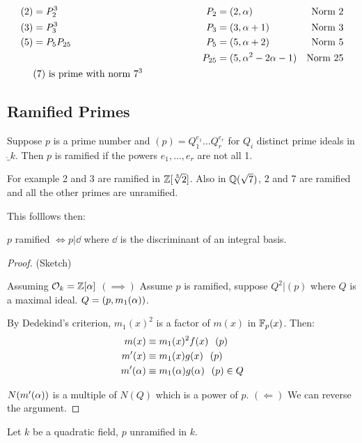 \documentclass[11pt]{article}
\begin{document}
 \begin{align*}
	 (2) &= P_2^3   \hspace{125pt}&    P_2 &= (2, \A) & \text{Norm 2}\\
	 (3) &= P_3^3            \hspace{125pt}& P_3 &=(3, \A+1) & \text{Norm 3} \\
	 (5) &= P_5 P_{25} 	\hspace{125pt} & P_5 &= (5,\A+2) & \text{Norm 5}\\
	 & \hspace{125pt} & P_{25} &= (5, \A^2 - 2\A-1) & \text{Norm 25}\\
	 &(7) \text{ is prime with norm } 7^3
 \end{align*}
 
 \subsection{Ramified Primes}

 Suppose $p$ is a prime number and $(p) = Q_1^{e_1} \dots Q_r^{e_r}$ for $Q_i$ distinct prime ideals in $\ring_k$.
 Then $p$ is ramified if the powers $e_1, \dots, e_r$ are not all 1.

 For example 2 and 3 are ramified in $\mathbb{Z}[\sqrt[3]{2}]$.
 \spac
 Also in $\mathbb{Q}(\sqrt7)$, 2 and 7 are ramified and all the other primes are unramified.

 This folllows then:
 
 \begin{theorem}
$p$ ramified $\iff p | \dd$ where $\dd$ is the discriminant of an integral basis.
 \end{theorem}
 
 
 \begin{proof}
	 (Sketch)

	 Assuming $\mathcal{O}_k = \mathbb{Z}[\alpha]$
	 \spac
	 $(\implies) $ Assume $p$ is ramified, suppose $Q^2 | (p)$ where $Q$ is a maximal ideal. 
	 $Q = (p, m_1(\alpha))$.

	 By Dedekind's criterion, $m_1(x)^2$ is a factor of $m(x)$ in $\mathbb{F}_p(x)$.
	 Then:
	 \begin{align*}
		 m(x) &\equiv m_1(x)^2 f(x) \hspace{7pt} (p)\\
		 m'(x) &\equiv m_1(x) g(x) \hspace{7pt} (p)\\
		 m'(\alpha) &\equiv m_1(\alpha) g(\alpha) \hspace{7pt} (p) \in Q
	 \end{align*}

	 $N(m'(\alpha))$ is a multiple of $N(Q)$ which is a power of $p$.
	 \spac
	 $(\Longleftarrow)$ We can reverse the argument.
 \end{proof}
 \spac Let $k$ be a quadratic field, $p$ unramified in $k$.
\end{document}

